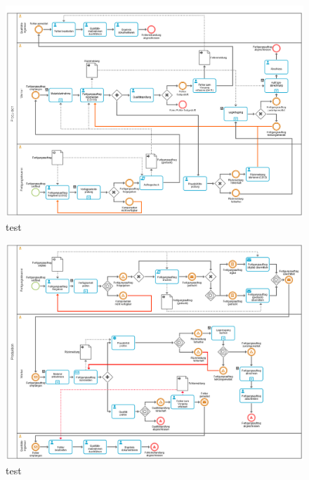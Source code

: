 \begin{figure}[H]
	\centering 
	\includegraphics[angle=270,width=\textwidth]{img/Order_Operating_IST.png}	\caption[TEST]{\label{fig:logo}test
	}
\end{figure}

\begin{figure}[H]
	\centering 
	\includegraphics[angle=270,width=\textwidth]{img/Order_Operating_SOLL.png}	\caption[TEST]{\label{fig:logo}test
	}
\end{figure}

\begin{figure}[H]
\centering 

\end{figure}

\begin{figure}[H]
\centering 

\end{figure}

